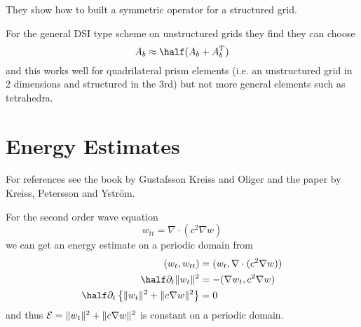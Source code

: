 \documentclass[10pt]{article}
\newcommand{\grad}{\nabla}
\begin{document}
They show how to built a symmetric operator for a structured grid.


For the general DSI type scheme on unstructured grids they find they can choose
\[
   A_b \approx \half( A_b + A_b^T ) 
\]
and this works well for quadrilateral prism elements (i.e. an unstructured grid in 2 dimensions and
structured in the 3rd) but not more general elements such as tetrahedra.


\clearpage
\section{Energy Estimates}

For references see the book by Gustafsson Kreiss and Oliger\cite{GustafssonKreissOliger95} and the paper
by Kreiss, Petersson and Ystr\"om\cite{KreissPeterssonYstrom2002}.


For the second order wave equation
\[
    w_{tt} = \grad\cdot( c^2  \grad w)
\]
we can get an energy estimate on a periodic domain from 
\begin{align*}
  (w_t,w_{tt}) & = (w_t, \grad\cdot( c^2 \grad w) ) \\
  \half \partial_t \| w_t \|^2 &= - ( \grad w_t, c^2 \grad w ) \\
   \half \partial_t \left\{ \| w_t \|^2 + \| c \grad w \|^2 \right\} &= 0 
\end{align*} 
and thus ${\cal E} = \| w_t \|^2 + \| c \grad w \|^2$ is constant on a periodic domain.
\end{document}
